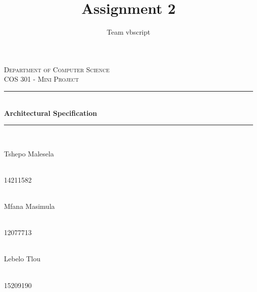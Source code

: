 \documentclass[a4paper,12pt]{report}
\author{Team vbscript}
\title{ Assignment 2}
\newcommand{\HRule}{\rule{\linewidth}{0.5mm}}
\begin{document}
\setlength{\parskip}{6pt}

\begin{titlepage}

\begin{center}
  
\textsc{\LARGE Department of Computer Science}\\[1.5cm]
\textsc{\Large COS 301 - Mini Project}\\[0.5cm]
\HRule \\[0.4cm]
{ \huge \bfseries Architectural Specification}\\[0.4cm]
\HRule \\[0.4cm]
\begin{minipage}{0.4\textwidth}
			\begin{flushleft} \large
				Tshepo {Malesela}
			\end{flushleft}
		\end{minipage}
		\begin{minipage}{0.4\textwidth}
			\begin{flushright} \large
				\emph{} \\
				14211582  
			\end{flushright}
		\end{minipage}
		
		\begin{minipage}{0.4\textwidth}
			\begin{flushleft} \large
				\emph{} \\
				Mfana {Masimula}
			\end{flushleft}
		\end{minipage}
		\begin{minipage}{0.4\textwidth}
			\begin{flushright} \large
				\emph{} \\
				12077713
			\end{flushright}
		\end{minipage}
		
		
		\begin{minipage}{0.4\textwidth}
			\begin{flushleft} \large
				\emph{} \\
				Lebelo {Tlou}
			\end{flushleft}
		\end{minipage}
		\begin{minipage}{0.4\textwidth}
			\begin{flushright} \large
				\emph{} \\
				15209190
			\end{flushright}
		\end{minipage}


\end{center}
\end{titlepage}
\end{document}
